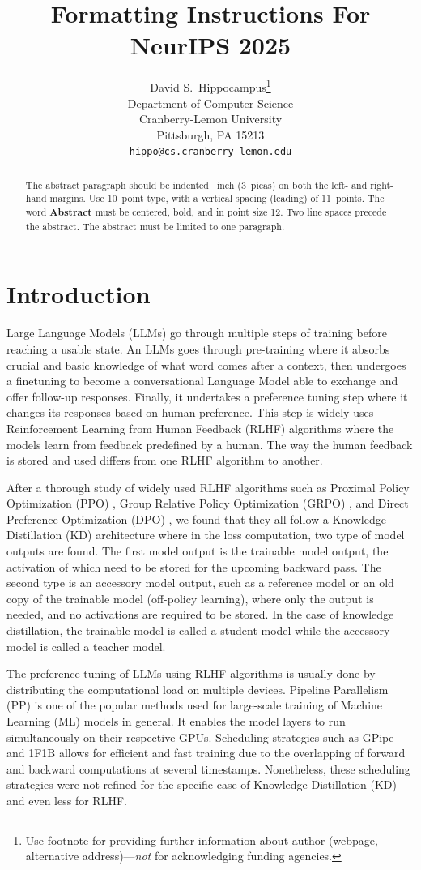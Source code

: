 \documentclass{article}
\title{Formatting Instructions For NeurIPS 2025 }
\author{%
  David S.~Hippocampus\thanks{Use footnote for providing further information
    about author (webpage, alternative address)---\emph{not} for acknowledging
    funding agencies.} \\
  Department of Computer Science\\
  Cranberry-Lemon University\\
  Pittsburgh, PA 15213 \\
  \texttt{hippo@cs.cranberry-lemon.edu} \\
}
\begin{document}
\maketitle


\begin{abstract}
  The abstract paragraph should be indented ~inch (3~picas) on
  both the left- and right-hand margins. Use 10~point type, with a vertical
  spacing (leading) of 11~points.  The word \textbf{Abstract} must be centered,
  bold, and in point size 12. Two line spaces precede the abstract. The abstract
  must be limited to one paragraph.
\end{abstract}


\section{Introduction}
Large Language Models (LLMs) go through multiple steps of training before reaching a usable state. An LLMs goes through pre-training where it absorbs crucial and basic knowledge of what word comes after a context, then undergoes a finetuning to become a conversational Language Model able to exchange and offer follow-up responses. Finally, it undertakes a preference tuning step where it changes its responses based on human preference. This step is widely uses Reinforcement Learning from Human Feedback (RLHF) algorithms where the models learn from feedback predefined by a human. The way the human feedback is stored and used differs from one RLHF algorithm to another.

After a thorough study of widely used RLHF algorithms such as Proximal Policy Optimization (PPO) \cite{}, Group Relative Policy Optimization (GRPO) \cite{}, and Direct Preference Optimization (DPO) \cite{}, we found that they all follow a Knowledge Distillation (KD) architecture where in the loss computation, two type of model outputs are found. The first model output is the trainable model output, the activation of which need to be stored for the upcoming backward pass. The second type is an accessory model output, such as a reference model or an old copy of the trainable model (off-policy learning), where only the output is needed, and no activations are required to be stored. In the case of knowledge distillation, the trainable model is called a student model while the accessory model is called a teacher model.

The preference tuning of LLMs using RLHF algorithms is usually done by distributing the computational load on multiple devices. Pipeline Parallelism (PP) is one of the popular methods used for large-scale training of Machine Learning (ML) models in general. It enables the model layers to run simultaneously on their respective GPUs. Scheduling strategies such as GPipe \cite{} and 1F1B \cite{} allows for efficient and fast training due to the overlapping of forward and backward computations at several timestamps. Nonetheless, these scheduling strategies were not refined for the specific case of Knowledge Distillation (KD) and even less for RLHF.
\end{document}
